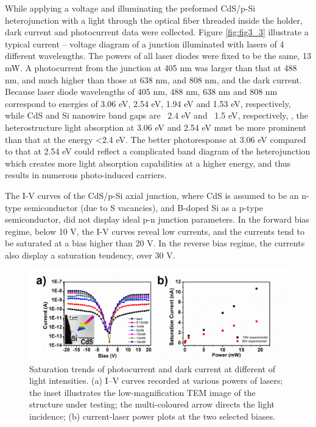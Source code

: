 While applying a voltage and illuminating the preformed CdS/p-Si heterojunction with a light through the optical fiber threaded inside the holder, dark current and photocurrent data were collected. Figure \ref{fig:fig3_3} illustrate a typical current – voltage diagram of a junction illuminated with lasers of 4 different wavelengths. The powers of all laser diodes were fixed to be the same, 13 mW. A photocurrent from the junction at 405 nm was larger than that at 488 nm, and much higher than those at 638 nm, and 808 nm, and the dark current. Because laser diode wavelengths of 405 nm, 488 nm, 638 nm and 808 nm correspond to energies of 3.06 eV, 2.54 eV, 1.94 eV and 1.53 eV, respectively, while CdS and Si nanowire band gaps are ~2.4 eV and ~1.5 eV, respectively, \cite{Fabbri2014}, the heterostructure light absorption at 3.06 eV and 2.54 eV must be more prominent than that at the energy <2.4 eV. The better photoresponse at 3.06 eV compared to that at 2.54 eV could reflect a complicated band diagram of the heterojunction which creates more light absorption capabilities at a higher energy, and thus results in numerous photo-induced carriers. 


The I-V curves of the CdS/p-Si axial junction, where CdS is assumed to be an n-type semiconductor (due to S vacancies), and B-doped Si as a p-type semiconductor, did not display ideal p-n junction parameters. In the forward bias regime, below 10 V, the I-V curves reveal low currents, and the currents tend to be saturated at a bias higher than 20 V. In the reverse bias regime, the currents also display a saturation tendency, over 30 V. 

\begin{figure}  
\includegraphics[width=\textwidth]{figures/figure3_5}
\caption[Photocurrent at different power]{Saturation trends of photocurrent and dark current at different of light intensities. (a) I–V curves recorded at various powers of lasers; the inset illustrates the low-magnification TEM image of the structure under testing; the multi-coloured arrow directs the light incidence; (b) current-laser power plots at the two selected biases.
\label{fig:fig3_5}}
\end{figure}

